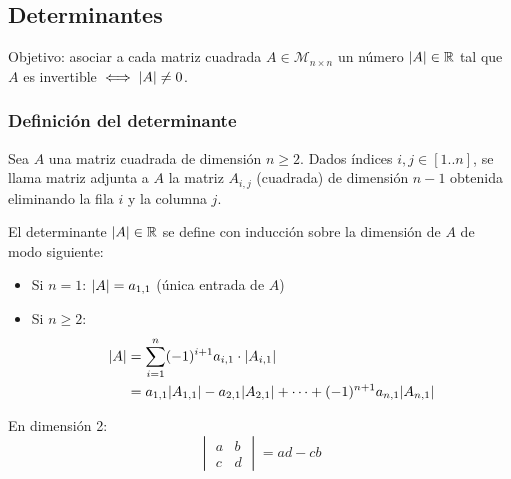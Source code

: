 \documentclass[11pt,a4paper]{article}
\newcommand{\M}{\mathcal{M}}
\begin{document}
\subsection{Determinantes}

Objetivo: asociar a cada matriz cuadrada $A\in\M_{n\times n}$ un número $\lvert A\rvert\in\mathbb{R}$ tal que $A$ es invertible $\iff\lvert A\rvert\neq0$.

\subsubsection*{Definición del determinante}

\begin{definicion}
Sea $A$ una matriz cuadrada de dimensión $n\geq2$. Dados índices $i,j\in[1..n]$, se llama matriz adjunta a $A$ la matriz $A_{i,j}$ (cuadrada) de dimensión $n-1$ obtenida eliminando la fila $i$ y la columna $j$.
\begin{center}
\end{center}
\end{definicion}

\begin{definicion}
El determinante $\lvert A\rvert\in\mathbb{R}$ se define con inducción sobre la dimensión de $A$ de modo siguiente:
\begin{itemize}
  \item Si $n=1$: $\lvert A\rvert=a_{1,1}$ (única entrada de $A$)
  \item Si $n\geq2$:
  \begin{align*}
  \lvert A\rvert&=\sum_{i=1}^{n}(-1)^{i+1}a_{i,1}\cdot\lvert A_{i,1}\rvert\\
  &=a_{1,1}\lvert A_{1,1}\rvert-a_{2,1}\lvert A_{2,1}\rvert+\dots+(-1)^{n+1}a_{n,1}\lvert A_{n,1}\rvert
  \end{align*}
\end{itemize}
\end{definicion}

\begin{proposicion}
En dimensión 2:
\[
\begin{vmatrix}a&b\\c&d\end{vmatrix}=ad-cb
\]
\end{proposicion}
\end{document}
